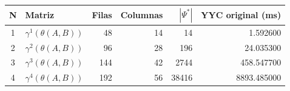 \begin{tabular}{c l r r r r}
\toprule
N & Matriz & Filas & Columnas & $|\Psi^*|$ & YYC original (ms) \\
\midrule
1 & $\gamma^{1}(\theta(A,B))$ & 48 & 14 & 14 & 1.592600 \\
2 & $\gamma^{2}(\theta(A,B))$ & 96 & 28 & 196 & 24.035300 \\
3 & $\gamma^{3}(\theta(A,B))$ & 144 & 42 & 2744 & 458.547700 \\
4 & $\gamma^{4}(\theta(A,B))$ & 192 & 56 & 38416 & 8893.485000 \\
\bottomrule
\end{tabular}
